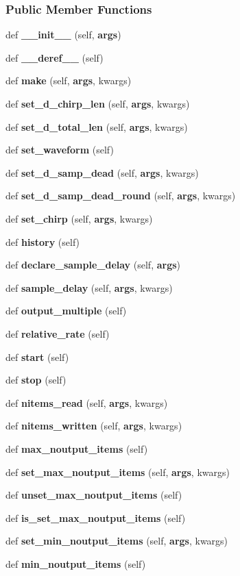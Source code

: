 \subsubsection*{Public Member Functions}
\begin{DoxyCompactItemize}
\item 
def {\bf \+\_\+\+\_\+init\+\_\+\+\_\+} (self, {\bf args})
\item 
def {\bf \+\_\+\+\_\+deref\+\_\+\+\_\+} (self)
\item 
def {\bf make} (self, {\bf args}, kwargs)
\item 
def {\bf set\+\_\+d\+\_\+chirp\+\_\+len} (self, {\bf args}, kwargs)
\item 
def {\bf set\+\_\+d\+\_\+total\+\_\+len} (self, {\bf args}, kwargs)
\item 
def {\bf set\+\_\+waveform} (self)
\item 
def {\bf set\+\_\+d\+\_\+samp\+\_\+dead} (self, {\bf args}, kwargs)
\item 
def {\bf set\+\_\+d\+\_\+samp\+\_\+dead\+\_\+round} (self, {\bf args}, kwargs)
\item 
def {\bf set\+\_\+chirp} (self, {\bf args}, kwargs)
\item 
def {\bf history} (self)
\item 
def {\bf declare\+\_\+sample\+\_\+delay} (self, {\bf args})
\item 
def {\bf sample\+\_\+delay} (self, {\bf args}, kwargs)
\item 
def {\bf output\+\_\+multiple} (self)
\item 
def {\bf relative\+\_\+rate} (self)
\item 
def {\bf start} (self)
\item 
def {\bf stop} (self)
\item 
def {\bf nitems\+\_\+read} (self, {\bf args}, kwargs)
\item 
def {\bf nitems\+\_\+written} (self, {\bf args}, kwargs)
\item 
def {\bf max\+\_\+noutput\+\_\+items} (self)
\item 
def {\bf set\+\_\+max\+\_\+noutput\+\_\+items} (self, {\bf args}, kwargs)
\item 
def {\bf unset\+\_\+max\+\_\+noutput\+\_\+items} (self)
\item 
def {\bf is\+\_\+set\+\_\+max\+\_\+noutput\+\_\+items} (self)
\item 
def {\bf set\+\_\+min\+\_\+noutput\+\_\+items} (self, {\bf args}, kwargs)
\item 
def {\bf min\+\_\+noutput\+\_\+items} (self)

\end{DoxyCompactItemize}
